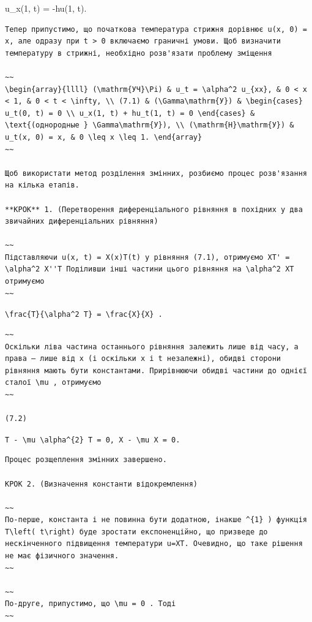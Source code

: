 \documentclass[
  ukrainian,
]{article}
\begin{document}
u\_x(1, t) = -hu(1, t).

\begin{verbatim}
Тепер припустимо, що початкова температура стрижня дорівнює u(x, 0) = x, але одразу при t > 0 включаємо граничні умови. Щоб визначити температуру в стрижні, необхідно розв'язати проблему зміщення

~~
\begin{array}{llll} (\mathrm{УЧ}\Pi) & u_t = \alpha^2 u_{xx}, & 0 < x < 1, & 0 < t < \infty, \\ (7.1) & (\Gamma\mathrm{У}) & \begin{cases} u_t(0, t) = 0 \\ u_x(1, t) + hu_t(1, t) = 0 \end{cases} & \text{(однородные } \Gamma\mathrm{У}), \\ (\mathrm{H}\mathrm{У}) & u_t(x, 0) = x, & 0 \leq x \leq 1. \end{array}
~~

Щоб використати метод розділення змінних, розбиємо процес розв'язання на кілька етапів.

**КРОК** 1. (Перетворення диференціального рівняння в похідних у два звичайних диференціальних рівняння)

~~
Підставляючи u(x, t) = X(x)T(t) у рівняння (7.1), отримуємо XT' = \alpha^2 X''T Поділивши інші частини цього рівняння на \alpha^2 XT отримуємо
~~
\end{verbatim}

\texttt{\textbackslash{}frac\{T\textquotesingle{}\}\{\textbackslash{}alpha\^{}2\ T\}\ =\ \textbackslash{}frac\{X\textquotesingle{}\textquotesingle{}\}\{X\}\ .}

\begin{verbatim}
~~
Оскільки ліва частина останнього рівняння залежить лише від часу, а права — лише від x (і оскільки x і t незалежні), обидві сторони рівняння мають бути константами. Прирівнюючи обидві частини до однієї сталої \mu , отримуємо
~~

(7.2)
\end{verbatim}

\texttt{T\textquotesingle{}\ -\ \textbackslash{}mu\ \textbackslash{}alpha\^{}\{2\}\ T\ =\ 0,\ X\textquotesingle{}\textquotesingle{}\ -\ \textbackslash{}mu\ X\ =\ 0.}

\begin{verbatim}
Процес розщеплення змінних завершено.

КРОК 2. (Визначення константи відокремлення)

~~
По-перше, константа і не повинна бути додатною, інакше ^{1} ) функція T\left( t\right) буде зростати експоненційно, що призведе до нескінченного підвищення температури u=XT. Очевидно, що таке рішення не має фізичного значення.
~~

~~
По-друге, припустимо, що \mu = 0 . Тоді
~~
\end{verbatim}
\end{document}
